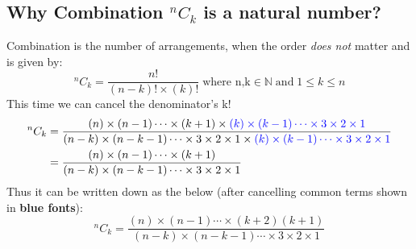\documentclass[12pt, twoside]{article}
\newcommand*{\Combination}[2]{{}^{#1}C_{#2}}%
\begin{document}
 	\subsection{Why Combination $\Combination{n}{k}$ is a natural number?}
 	Combination is the number of arrangements, when the order \textit{does not} matter and is given by:\newline
 	\begin{equation}
 		\Combination{n}{k} = \frac{n!}{(n-k)!\times(k)!} \; \text{where n,k} \in \mathbb{N} \; \text{and} \; 1 \leq k \leq n
 	\end{equation}
 	This time we can cancel the denominator's k!
 	\begin{align*}
 		\Combination{n}{k} &= \frac{(n)\times(n-1)\cdots\times(k+1)\times\color{blue}(k)\times(k-1)\cdots\times3\times2\times1}{(n-k)\times(n-k-1)\cdots\times3\times2\times1\times\color{blue}(k)\times(k-1)\cdots\times3\times2\times1}\\
 		&= \frac{(n)\times(n-1)\cdots\times(k+1)}{(n-k)\times(n-k-1)\cdots\times3\times2\times1}
 	\end{align*}
 Thus it can be written down as the below (after cancelling common terms shown in \textbf{\color{blue}blue fonts}):
 \begin{equation}
 	\Combination{n}{k} = \frac{(n)\times(n-1)\cdots\times(k+2)(k+1)}{(n-k)\times(n-k-1)\cdots\times3\times2\times1} \label{reducedCombinationForm}
 \end{equation}
\end{document}
